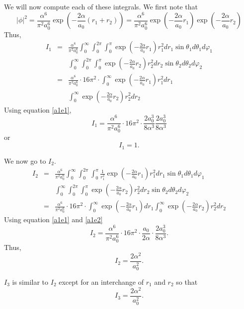 \documentclass{article}
\numberwithin{equation}{section}
\begin{document}
We will now compute each of these integrals. We first note that
\[
|\phi|^2 = 
\frac{\alpha^6}{\pi^2 a_0^6}\exp\left(-\frac{2\alpha}{a_0}(r_1+r_2)\right)
= \frac{\alpha^6}{\pi^2 a_0^6}\exp\left(-\frac{2\alpha}{a_0}r_1\right)
\exp\left(-\frac{2\alpha}{a_0}r_2\right)  
\]
Thus,
\begin{eqnarray*}
I_1 &=& \frac{\alpha^6}{\pi^2 a_0^6}
\int_0^\infty\int_0^{2\pi}\int_0^\pi\exp\left(-\frac{2\alpha}{a_0}r_1\right)
r_1^2dr_1\sin\theta_1d\theta_1d\varphi_1 \\
 & & 
\int_0^\infty\int_0^{2\pi}\int_0^\pi\exp\left(-\frac{2\alpha}{a_0}r_2\right)
r_2^2dr_2\sin\theta_2d\theta_2d\varphi_2 \\
 &=& \frac{\alpha^6}{\pi^2 a_0^6}\cdot 16\pi^2 \cdot
 \int_0^\infty\exp\left(-\frac{2\alpha}{a_0}r_1\right)r_1^2dr_1 \\
 & & \int_0^\infty\exp\left(-\frac{2\alpha}{a_0}r_2\right)r_2^2dr_2 
\end{eqnarray*}
Using equation \eqref{a1e1},
\[
I_1 = \frac{\alpha^6}{\pi^2 a_0^6}\cdot 16\pi^2 \cdot
 \frac{2a_0^3}{8\alpha^3}\frac{2a_0^3}{8\alpha^3}
\]
or
\begin{equation}\label{s5e72}
I_1 = 1.
\end{equation}

We now go to $I_2$.
\begin{eqnarray*}
I_2 &=& \frac{\alpha^6}{\pi^2 a_0^6}
\int_0^\infty\int_0^{2\pi}\int_0^\pi
\frac{1}{r_1^2}\exp\left(-\frac{2\alpha}{a_0}r_1\right)
r_1^2dr_1\sin\theta_1d\theta_1d\varphi_1 \\
 & & 
\int_0^\infty\int_0^{2\pi}\int_0^\pi\exp\left(-\frac{2\alpha}{a_0}r_2\right)
r_2^2dr_2\sin\theta_2d\theta_2d\varphi_2 \\
 &=& \frac{\alpha^6}{\pi^2 a_0^6}\cdot 16\pi^2 \cdot
 \int_0^\infty\exp\left(-\frac{2\alpha}{a_0}r_1\right)dr_1 
 \int_0^\infty\exp\left(-\frac{2\alpha}{a_0}r_2\right)r_2^2dr_2 
\end{eqnarray*}
Using equation \eqref{a1e1} and \eqref{a1e2}
\[
I_2 = \frac{\alpha^6}{\pi^2 a_0^6}\cdot 16\pi^2 \cdot \frac{a_0}{2\alpha}
\cdot \frac{2a_0^3}{8\alpha^3}.
\]
Thus,
\begin{equation}\label{s5e73}
I_2 = \frac{2\alpha^2}{a_0^2}.
\end{equation}

$I_3$ is similar to $I_2$ except for an interchange of $r_1$ and $r_2$ so
that
\begin{equation}\label{s5e74}
I_3 = \frac{2\alpha^2}{a_0^2}.
\end{equation}
\end{document}
